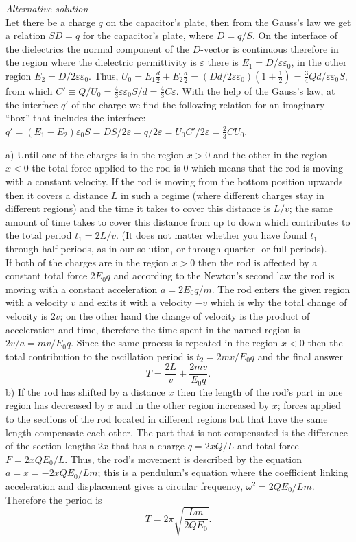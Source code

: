 \documentclass[11pt]{article}
\begin{document}
\emph{Alternative solution}\\
Let there be a charge $q$ on the capacitor’s plate, then from the Gauss’s law we get a relation $SD=q$ for the capacitor’s plate, where $D=q/S$. On the interface of the dielectrics the normal component of the $D$-vector is continuous therefore in the region where the dielectric permittivity is $\varepsilon$ there is $E_1=D/\varepsilon\varepsilon_0$, in the other region $E_2=D/2\varepsilon\varepsilon_0$. Thus, $U_0=E_1\frac d2+E_2\frac d2=(Dd/2\varepsilon\varepsilon_0)(1+\frac 12)=\frac 34Qd/\varepsilon\varepsilon_0S$, from which $C'\equiv Q/U_0=\frac 43\varepsilon\varepsilon_0S/d=\frac 43C\varepsilon$. With the help of the Gauss’s law, at the interface $q'$ of the charge we find the following relation for an imaginary “box” that includes the interface: $q'=(E_1-E_2)\varepsilon_0S=DS/2\varepsilon=q/2\varepsilon=U_0C'/2\varepsilon=\frac 23CU_0$.
\probend
\bigskip


\solueng
a) Until one of the charges is in the region $x>0$ and the other in the region $x<0$ the total force applied to the rod is 0 which means that the rod is moving with a constant velocity. If the rod is moving from the bottom position upwards then it covers a distance $L$ in such a regime (where different charges stay in different regions) and the time it takes to cover this distance is $L/v$; the same amount of time takes to cover this distance from up to down which contributes to the total period $t_1=2L/v$. (It does not matter whether you have found $t_1$ through half-periods, as in our solution, or through quarter- or full periods).\\
If both of the charges are in the region $x> 0$ then the rod is affected by a constant total force $2E_0q$ and according to the Newton’s second law the rod is moving with a constant acceleration $a=2E_0q/m$. The rod enters the given region with a velocity $v$ and exits it with a velocity $-v$ which is why the total change of velocity is $2v$; on the other hand the change of velocity is the product of acceleration and time, therefore the time spent in the named region is $2v/a=mv/E_0q$. Since the same process is repeated in the region $x<0$ then the total contribution to the oscillation period is $t_2=2mv/E_0q$ and the final answer 
\[ T=\frac{2L}v+\frac {2mv}{E_0q}. \] 
b) If the rod has shifted by a distance $x$ then the length of the rod’s part in one region has decreased by $x$ and in the other region increased by $x$; forces applied to the sections of the rod located in different regions but that have the same length compensate each other. The part that is not compensated is the difference of the section lengths $2x$ that has a charge $q=2xQ/L$ and total force $F=2xQE_0/L$. Thus, the rod’s movement is described by the equation $a=\ddot x= -2xQE_0/Lm$; this is a pendulum’s equation where the coefficient linking acceleration and displacement gives a circular frequency, $\omega^2=2QE_0/Lm$. Therefore the period is
\[ T=2\pi\sqrt{\frac{Lm}{2QE_0}}.\]
\probend
\bigskip
\end{document}
